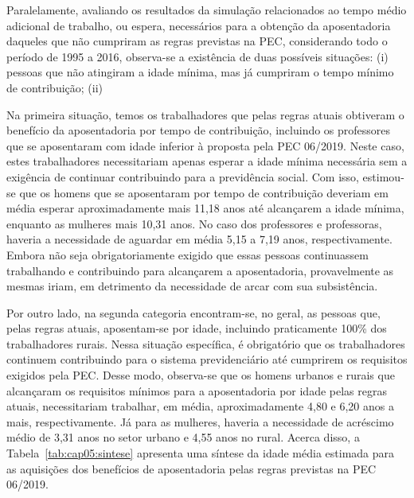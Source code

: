 Paralelamente, avaliando os resultados da simulação relacionados ao tempo médio adicional de trabalho, ou espera, necessários para a obtenção da aposentadoria daqueles que não cumpriram as regras previstas na PEC, considerando todo o período de 1995 a 2016, observa-se a existência de duas possíveis situações: (i) pessoas que não atingiram a idade mínima, mas já cumpriram o tempo mínimo de contribuição; (ii) 

Na primeira situação, temos os trabalhadores que pelas regras atuais obtiveram o benefício da aposentadoria por tempo de contribuição, incluindo os professores que se aposentaram com idade inferior à proposta pela PEC 06/2019. Neste caso, estes trabalhadores necessitariam apenas esperar a idade mínima necessária sem a exigência de continuar contribuindo para a previdência social. Com isso, estimou-se que os homens que se aposentaram por tempo de contribuição deveriam em média esperar aproximadamente mais 11,18 anos até alcançarem a idade mínima, enquanto as mulheres mais 10,31 anos. No caso dos professores e professoras, haveria a necessidade de aguardar em média 5,15 a 7,19 anos, respectivamente. Embora não seja obrigatoriamente exigido que essas pessoas continuassem trabalhando e contribuindo para alcançarem a aposentadoria, provavelmente as mesmas iriam, em detrimento da necessidade de arcar com sua subsistência.

Por outro lado, na segunda categoria encontram-se, no geral, as pessoas que, pelas regras atuais, aposentam-se por idade, incluindo praticamente 100\% dos trabalhadores rurais. Nessa situação específica, é obrigatório que os trabalhadores continuem contribuindo para o sistema previdenciário até cumprirem os requisitos exigidos pela PEC. Desse modo, observa-se que os homens urbanos e rurais que alcançaram os requisitos mínimos para a aposentadoria por idade pelas regras atuais, necessitariam trabalhar, em média, aproximadamente 4,80 e 6,20 anos a mais, respectivamente. Já para as mulheres, haveria a necessidade de acréscimo médio de 3,31 anos no setor urbano e 4,55 anos no rural. Acerca disso, a Tabela~\ref{tab:cap05:sintese} apresenta uma síntese da idade média estimada para as aquisições dos benefícios de aposentadoria pelas regras previstas na PEC 06/2019.


